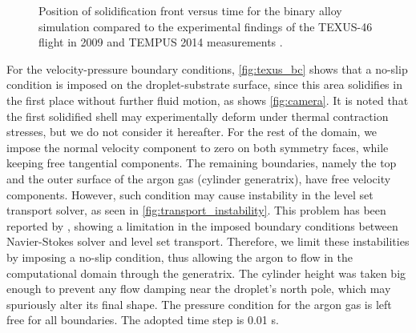 \begin{figure}[htbp]
\centering
{}
\caption{Position of solidification front versus time for the binary alloy 
simulation compared to the experimental findings of the TEXUS-46 flight 
in 2009 and TEMPUS 2014 measurements \citep{gandin_project_2014}.}
\label{fig:position_vs_time_binary}
\end{figure}


For the velocity-pressure boundary conditions, \cref{fig:texus_bc} shows that a no-slip condition is imposed
on the droplet-substrate surface, 
since this area solidifies in the first place without further fluid motion, as shows \cref{fig:camera}.
It is noted that the first solidified shell may experimentally deform under thermal contraction stresses, but we do not consider it 
hereafter. For the rest of the domain, we impose the normal velocity component to zero on both symmetry faces, 
while keeping free tangential components. The remaining boundaries, namely the top and the outer surface of the argon gas (cylinder generatrix),
have free velocity components. However, such condition may cause instability in the level set transport solver, as seen in \cref{fig:transport_instability}. 
This problem has been reported by \citep{basset_simulation_2006}, showing a limitation in the imposed boundary conditions between Navier-Stokes solver and level set transport. 
Therefore, we limit these instabilities by imposing a no-slip condition, thus allowing the argon to flow in the computational
domain through the generatrix. The cylinder height was taken big enough to prevent any flow damping near the droplet's north pole,
which may spuriously alter its final shape. The pressure condition for the argon gas is left free for all boundaries.
The adopted time step is 0.01 s.

